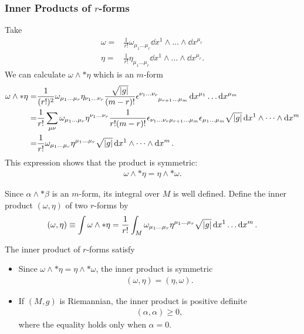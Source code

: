 \documentclass[10pt]{article}
\begin{document}
\subsubsection{Inner Products of \texorpdfstring{{}$r$}{}-forms}
Take
\begin{align}
    \omega= & \frac{1}{r!}\omega_{\mu_1\dots\mu_r}\dd{x^1}\wedge\dots\wedge\dd{x^{\mu_r}} \\
    \eta=   & \frac{1}{r!}\eta_{\mu_1\dots\mu_r}\dd{x^1}\wedge\dots\wedge\dd{x^{\mu_r}}.
\end{align}
We can calculate $\omega\wedge\ast\eta$ which is an $m$-form
\begin{align}
    \omega\wedge\ast\eta= & \frac{1}{(r!)^2}\omega_{\mu_1\dots\mu_r}\eta_{\nu_1\dots\nu_r}\frac{\sqrt{\abs{g}}}{(m-r)!}\tensor{\epsilon}{^{\nu_1\dots\nu_r}_{\mu_{r+1}\dots\mu_m}}\dd{x^{\mu_1}}\dots\dd{x^{\mu_m}}\notag                         \\
    =                     & \frac{1}{r!}\sum_{\mu\nu}\omega_{\mu_1\dots\mu_r}\eta^{\nu_1\dots\nu_r}\frac{1}{r!(m-r)!}\epsilon_{\nu_1\dots\nu_r\mu_{r+1}\dots\mu_m}\epsilon_{\mu_1\dots\mu_m}\sqrt{\abs{g}}\dd{x^1}\wedge\dots\wedge\dd{x^m}\notag \\
    =                     & \frac{1}{r!}\omega_{\mu_1\dots\mu_r}\eta^{\mu_1\dots\mu_r}\sqrt{\abs{g}}\dd{x^1}\wedge\dots\wedge\dd{x^m}.\label{omegawedge*mu}
\end{align}
This expression shows that the product is symmetric:
\begin{align}
    \omega\wedge\ast\eta=\eta\wedge\ast\omega.
\end{align}

\begin{definition}
    Since $\alpha\wedge\ast\beta$ is an $m$-form, its integral over $M$ is well defined.
    Define the inner product $(\omega,\eta)$ of two $r$-forms by
    \begin{align}
        (\omega,\eta)\equiv\int\omega\wedge\ast\eta=\frac{1}{r!}\int_M\omega_{\mu_1\dots\mu_r}\eta^{\mu_1\dots\mu_r}\sqrt{\abs{g}}\dd{x^1}\dots\dd{x^m}.
    \end{align}
\end{definition}
\begin{property}
    The inner product of $r$-forms satisfy
    \begin{itemize}
        \item Since $\omega\wedge\ast\eta=\eta\wedge\ast\omega$, the inner product is symmetric
              \begin{align}
                  (\omega,\eta)=(\eta,\omega).
              \end{align}
        \item If $(M,g)$ is Riemannian, the inner product is positive definite
              \begin{align}
                  (\alpha,\alpha)\geq0,
              \end{align}
              where the equality holds only when $\alpha=0$.
    \end{itemize}
\end{property}
\end{document}
